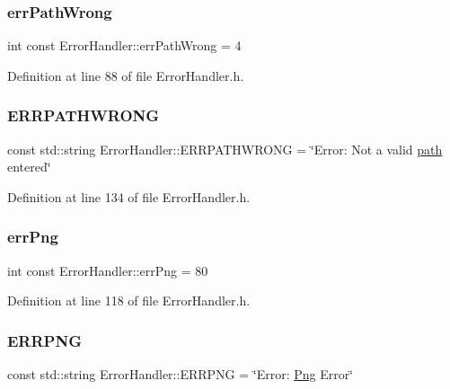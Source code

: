 \subsubsection{\texorpdfstring{errPathWrong}{errPathWrong}}
{\footnotesize\ttfamily int const Error\+Handler\+::err\+Path\+Wrong = 4\hspace{0.3cm}{\ttfamily [static]}}



Definition at line 88 of file Error\+Handler.\+h.

\mbox{\label{classErrorHandler_aaab6de85cae710a56ae6324b06a42179}} 
\subsubsection{\texorpdfstring{ERRPATHWRONG}{ERRPATHWRONG}}
{\footnotesize\ttfamily const std\+::string Error\+Handler\+::\+E\+R\+R\+P\+A\+T\+H\+W\+R\+O\+NG = \char`\"{}Error\+: Not a valid \mbox{\hyperlink{classErrorHandler_aeabbc987b7eaa01b6d006b55b4e00574}{path}} entered\char`\"{}\hspace{0.3cm}{\ttfamily [static]}}



Definition at line 134 of file Error\+Handler.\+h.

\mbox{\label{classErrorHandler_a675f3fcaf9ff86df1e50aae59922f912}} 
\subsubsection{\texorpdfstring{errPng}{errPng}}
{\footnotesize\ttfamily int const Error\+Handler\+::err\+Png = 80\hspace{0.3cm}{\ttfamily [static]}}



Definition at line 118 of file Error\+Handler.\+h.

\mbox{\label{classErrorHandler_a8b7f4e33f0118e3a9a49308b8edbb5f3}} 
\subsubsection{\texorpdfstring{ERRPNG}{ERRPNG}}
{\footnotesize\ttfamily const std\+::string Error\+Handler\+::\+E\+R\+R\+P\+NG = \char`\"{}Error\+: \mbox{\hyperlink{classPng}{Png}} Error\char`\"{}\hspace{0.3cm}{\ttfamily [static]}}



